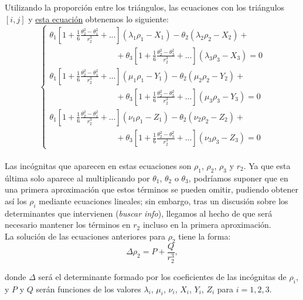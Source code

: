 \documentclass[11pt]{article}
\begin{document}
\subsection{}
Utilizando la proporción entre los triángulos, las ecuaciones con los triángulos $[i,j]$ y \hyperref[eq:relacion_C_S_E]{esta ecuación} obtenemos lo siguiente:
\[
\left\{
\begin{array}{l}
	\theta_1[1+\frac{1}{6}\frac{\theta_2^2-\theta_1^2}{r_2^3}+...] (\lambda_1\rho_1-X_1)-\theta_2(\lambda_2\rho_2-X_2)+\\ \; \; \; \; \; \; \; \; \; \; \; \; \; \; \; \; \; \; \; \; \; \; \; \; \; \; \; \; \; +\theta_3[1+\frac{1}{6}\frac{\theta_2^2-\theta_3^2}{r_2^3}+...] (\lambda_3\rho_3-X_3)=0\\

	\theta_1[1+\frac{1}{6}\frac{\theta_2^2-\theta_1^2}{r_2^3}+...] (\mu_1\rho_1-Y_1)-\theta_2(\mu_2\rho_2-Y_2)+\\ \; \; \; \; \; \; \; \; \; \; \; \; \; \; \; \; \; \; \; \; \; \; \; \; \; \; \; \; \; +\theta_3[1+\frac{1}{6}\frac{\theta_2^2-\theta_3^2}{r_2^3}+...] (\mu_3\rho_3-Y_3)=0\\

	\theta_1[1+\frac{1}{6}\frac{\theta_2^2-\theta_1^2}{r_2^3}+...] (\nu_1\rho_1-Z_1)-\theta_2(\nu_2\rho_2-Z_2)+\\ \; \; \; \; \; \; \; \; \; \; \; \; \; \; \; \; \; \; \; \; \; \; \; \; \; \; \; \; \; +\theta_3[1+\frac{1}{6}\frac{\theta_2^2-\theta_3^2}{r_2^3}+...] (\nu_3\rho_3-Z_3)=0
\end{array}
\right.
\]\\

Las incógnitas que aparecen en estas ecuaciones son $\rho_1$, $\rho_2$, $\rho_3$ y $r_2$. Ya que esta última solo aparece al multiplicando por $\theta_1$, $\theta_2$ o $\theta_3$, podríamos suponer que en una primera aproximación que estos términos se pueden omitir, pudiendo obtener así los $\rho_i$ mediante ecuaciones lineales; sin embargo, tras un discusión sobre los determinantes que intervienen (\textit{buscar info}), llegamos al hecho de que será necesario mantener los términos en $r_2$ incluso en la primera aproximación.\\

La solución de las ecuaciones anteriores para $\rho_2$ tiene la forma:
\[
\Delta\rho_2=P+\frac{Q}{r_2^3},
\]

\noindent donde $\Delta$ será el determinante formado por los coeficientes de las incógnitas de $\rho_i$, y $P$ y $Q$ serán funciones de los valores $\lambda_i$, $\mu_i$, $\nu_i$, $X_i$, $Y_i$, $Z_i$ para $i=1,2,3$.\\
\end{document}
